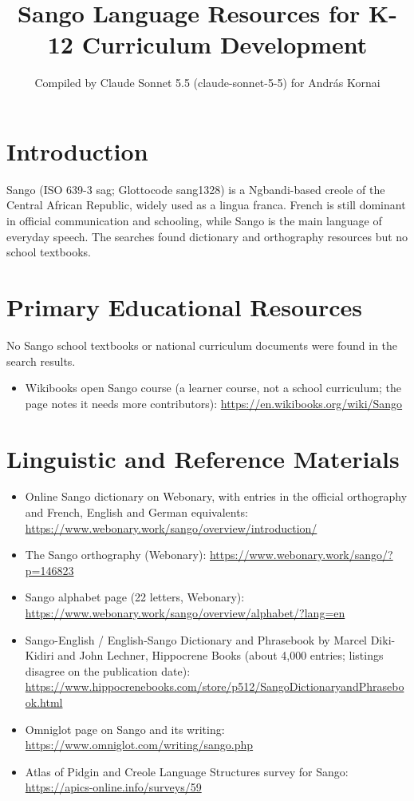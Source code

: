 \documentclass[12pt]{article}
\title{Sango Language Resources for K-12 Curriculum Development}
\author{Compiled by Claude Sonnet 5.5 (claude-sonnet-5-5) for Andr\'as Kornai}
\date{}
\begin{document}
\maketitle

\section{Introduction}
Sango (ISO 639-3 sag; Glottocode sang1328) is a Ngbandi-based creole of the Central African Republic, widely used as a lingua franca. French is still dominant in official communication and schooling, while Sango is the main language of everyday speech. The searches found dictionary and orthography resources but no school textbooks.

\section{Primary Educational Resources}
No Sango school textbooks or national curriculum documents were found in the search results.
\begin{itemize}
\item Wikibooks open Sango course (a learner course, not a school curriculum; the page notes it needs more contributors): \url{https://en.wikibooks.org/wiki/Sango}
\end{itemize}

\section{Linguistic and Reference Materials}
\begin{itemize}
\item Online Sango dictionary on Webonary, with entries in the official orthography and French, English and German equivalents: \url{https://www.webonary.work/sango/overview/introduction/}
\item The Sango orthography (Webonary): \url{https://www.webonary.work/sango/?p=146823}
\item Sango alphabet page (22 letters, Webonary): \url{https://www.webonary.work/sango/overview/alphabet/?lang=en}
\item Sango-English / English-Sango Dictionary and Phrasebook by Marcel Diki-Kidiri and John Lechner, Hippocrene Books (about 4,000 entries; listings disagree on the publication date): \url{https://www.hippocrenebooks.com/store/p512/SangoDictionaryandPhrasebook.html}
\item Omniglot page on Sango and its writing: \url{https://www.omniglot.com/writing/sango.php}
\item Atlas of Pidgin and Creole Language Structures survey for Sango: \url{https://apics-online.info/surveys/59}
\end{itemize}
\end{document}
